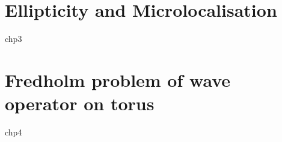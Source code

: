 \documentclass[12pt, twoside]{book}
\begin{document}
\chapter{Ellipticity and Microlocalisation}
{chp3}

\chapter[Fredholm problem of wave operator]{Fredholm problem of wave operator on torus}
{chp4}



\end{document}
